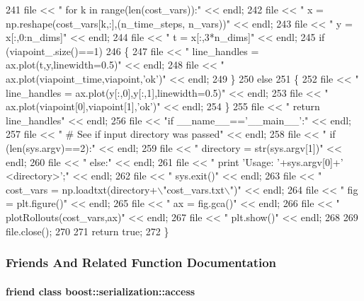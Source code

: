 \begin{DoxyCode}
241   file << \textcolor{stringliteral}{"    for k in range(len(cost\_vars)):"} << endl;
242   file << \textcolor{stringliteral}{"        x = np.reshape(cost\_vars[k,:],(n\_time\_steps, n\_vars))"} << endl;
243   file << \textcolor{stringliteral}{"        y = x[:,0:n\_dims]"} << endl;
244   file << \textcolor{stringliteral}{"        t = x[:,3*n\_dims]"} << endl;
245   \textcolor{keywordflow}{if} (viapoint\_.size()==1)
246   \{
247     file << \textcolor{stringliteral}{"        line\_handles = ax.plot(t,y,linewidth=0.5)"} << endl;
248     file << \textcolor{stringliteral}{"    ax.plot(viapoint\_time,viapoint,'ok')"} << endl;
249   \}
250   \textcolor{keywordflow}{else}
251   \{
252     file << \textcolor{stringliteral}{"        line\_handles = ax.plot(y[:,0],y[:,1],linewidth=0.5)"} << endl;
253     file << \textcolor{stringliteral}{"    ax.plot(viapoint[0],viapoint[1],'ok')"} << endl;
254   \}
255   file << \textcolor{stringliteral}{"    return line\_handles"} << endl;
256   file << \textcolor{stringliteral}{"if \_\_name\_\_=='\_\_main\_\_':"} << endl;
257   file << \textcolor{stringliteral}{"    # See if input directory was passed"} << endl;
258   file << \textcolor{stringliteral}{"    if (len(sys.argv)==2):"} << endl;
259   file << \textcolor{stringliteral}{"      directory = str(sys.argv[1])"} << endl;
260   file << \textcolor{stringliteral}{"    else:"} << endl;
261   file << \textcolor{stringliteral}{"      print 'Usage: '+sys.argv[0]+' <directory>';"} << endl;
262   file << \textcolor{stringliteral}{"      sys.exit()"} << endl;
263   file << \textcolor{stringliteral}{"    cost\_vars = np.loadtxt(directory+\(\backslash\)"cost\_vars.txt\(\backslash\)")"} << endl;
264   file << \textcolor{stringliteral}{"    fig = plt.figure()"} << endl;
265   file << \textcolor{stringliteral}{"    ax = fig.gca()"} << endl;
266   file << \textcolor{stringliteral}{"    plotRollouts(cost\_vars,ax)"} << endl;
267   file << \textcolor{stringliteral}{"    plt.show()"} << endl;
268   
269   file.close();
270   
271   \textcolor{keywordflow}{return} \textcolor{keyword}{true};
272 \}
\end{DoxyCode}


\subsubsection{Friends And Related Function Documentation}
\hypertarget{classDmpBbo_1_1TaskViapoint_ac98d07dd8f7b70e16ccb9a01abf56b9c}{
\paragraph[{boost\+::serialization\+::access}]{\setlength{\rightskip}{0pt plus 5cm}friend class boost\+::serialization\+::access\hspace{0.3cm}{\ttfamily [friend]}}}\label{classDmpBbo_1_1TaskViapoint_ac98d07dd8f7b70e16ccb9a01abf56b9c}


